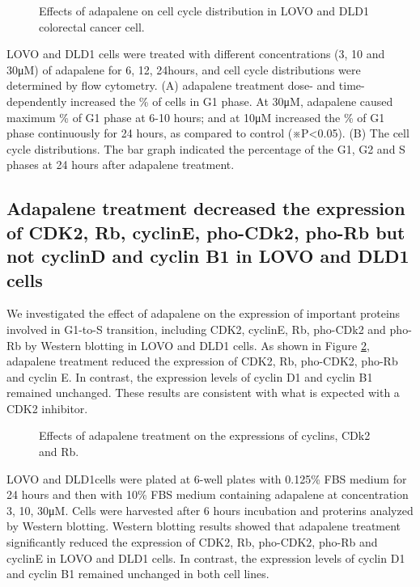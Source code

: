 \begin{figure}
\centering
\caption{Effects of adapalene on cell cycle distribution in LOVO and DLD1 colorectal cancer cell.}
\label{cdk2:CellCycleDistribution}
\end{figure}
LOVO and DLD1 cells were treated with different concentrations (3, 10 and 30μM) of adapalene for 6, 12, 24hours, and cell cycle distributions were determined by flow cytometry. (A) adapalene treatment dose- and time-dependently increased the \% of cells in G1 phase. At 30μM, adapalene caused maximum \% of G1 phase at 6-10 hours; and at 10μM increased the \% of G1 phase continuously for 24 hours, as compared to control (※P<0.05). (B) The cell cycle distributions. The bar graph indicated the percentage of the G1, G2 and S phases at 24 hours after adapalene treatment.

\subsection{Adapalene treatment decreased the expression of CDK2, Rb, cyclinE, pho-CDk2, pho-Rb but not cyclinD and cyclin B1 in LOVO and DLD1 cells}

We investigated the effect of adapalene on the expression of important proteins involved in G1-to-S transition, including CDK2, cyclinE, Rb, pho-CDk2 and pho-Rb by Western blotting in LOVO and DLD1 cells. As shown in Figure \ref{cdk2:WesternBlot}, adapalene treatment reduced the expression of CDK2, Rb, pho-CDK2, pho-Rb and cyclin E. In contrast, the expression levels of cyclin D1 and cyclin B1 remained unchanged. These results are consistent with what is expected with a CDK2 inhibitor.

\begin{figure}
\centering
\caption{Effects of adapalene treatment on the expressions of cyclins, CDk2 and Rb.}
\label{cdk2:WesternBlot}
\end{figure}
LOVO and DLD1cells were plated at 6-well plates with 0.125\% FBS medium for 24 hours and then with 10\% FBS medium containing adapalene at concentration 3, 10, 30μM. Cells were harvested after 6 hours incubation and proterins analyzed by Western blotting. Western blotting results showed that adapalene treatment significantly reduced the expression of CDK2, Rb, pho-CDK2, pho-Rb and cyclinE in LOVO and DLD1 cells. In contrast, the expression levels of cyclin D1 and cyclin B1 remained unchanged in both cell lines.


